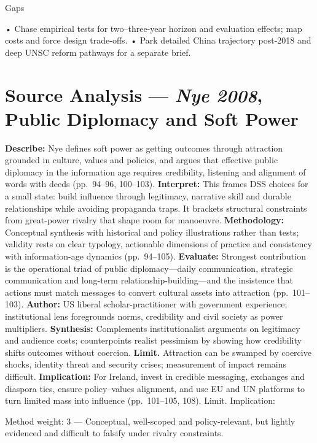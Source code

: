 Gaps

• Chase empirical tests for two–three-year horizon and evaluation effects; map costs and force design trade-offs.
• Park detailed China trajectory post-2018 and deep UNSC reform pathways for a separate brief.

\parencite{NYE_2008
}

\section*{Source Analysis — \textit{Nye 2008}, Public Diplomacy and Soft Power}
\textbf{Describe:} Nye defines soft power as getting outcomes through attraction grounded in culture, values and policies, and argues that effective public diplomacy in the information age requires credibility, listening and alignment of words with deeds (pp.~94–96, 100–103). 
\textbf{Interpret:} This frames DSS choices for a small state: build influence through legitimacy, narrative skill and durable relationships while avoiding propaganda traps. It brackets structural constraints from great-power rivalry that shape room for manoeuvre. 
\textbf{Methodology:} Conceptual synthesis with historical and policy illustrations rather than tests; validity rests on clear typology, actionable dimensions of practice and consistency with information-age dynamics (pp.~94–105). 
\textbf{Evaluate:} Strongest contribution is the operational triad of public diplomacy—daily communication, strategic communication and long-term relationship-building—and the insistence that actions must match messages to convert cultural assets into attraction (pp.~101–103). 
\textbf{Author:} US liberal scholar-practitioner with government experience; institutional lens foregrounds norms, credibility and civil society as power multipliers. 
\textbf{Synthesis:} Complements institutionalist arguments on legitimacy and audience costs; counterpoints realist pessimism by showing how credibility shifts outcomes without coercion. 
\textbf{Limit.} Attraction can be swamped by coercive shocks, identity threat and security crises; measurement of impact remains difficult. 
\textbf{Implication:} For Ireland, invest in credible messaging, exchanges and diaspora ties, ensure policy–values alignment, and use EU and UN platforms to turn limited mass into influence (pp.~101–105, 108). Limit. Implication:

Method weight: 3 — Conceptual, well-scoped and policy-relevant, but lightly evidenced and difficult to falsify under rivalry constraints.

